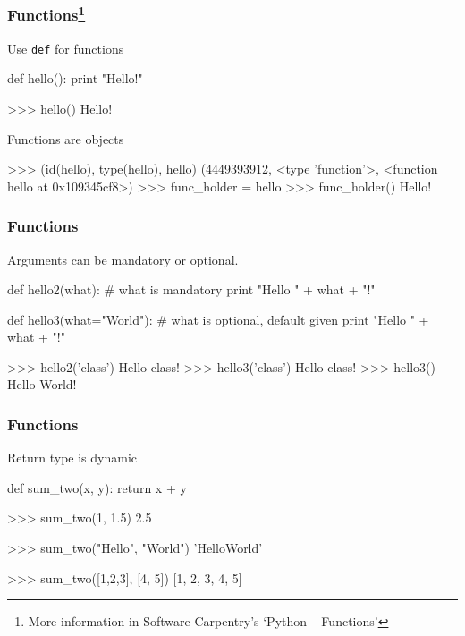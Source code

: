 \documentclass[xetex,10pt]{beamer}
\def\pythoni{\lstinline[language=pythontim]}
\def\spacer{\vspace*{1em}}
\begin{document}
\begin{frame}[fragile]
	\frametitle{Functions\footnote[frame]{More information in Software Carpentry's `Python -- Functions'}}

	Use \pythoni{def} for functions
\pause

\begin{python}
def hello():
    print "Hello!"
\end{python}
\begin{python}
>>> hello()
Hello!
\end{python}

	\spacer
\pause

Functions are objects
\begin{python}
>>> (id(hello), type(hello), hello)
(4449393912, <type 'function'>, <function hello at 0x109345cf8>)
>>> func_holder = hello
>>> func_holder()
Hello!
\end{python}
\end{frame}

\begin{frame}[fragile]
	\frametitle{Functions}

	Arguments can be mandatory or optional.
	
\begin{python}
def hello2(what):			# what is mandatory
    print "Hello " + what + "!"

def hello3(what="World"):	# what is optional, default given
    print "Hello " + what + "!"
\end{python}

	\spacer
	\pause

\begin{python}
>>> hello2('class')
Hello class!
>>> hello3('class')
Hello class!
>>> hello3()
Hello World!
\end{python}
\end{frame}

\begin{frame}[fragile]
	\frametitle{Functions}
	Return type is dynamic

\begin{python}
def sum_two(x, y):
    return x + y
\end{python}

	\spacer

\begin{python}
>>> sum_two(1, 1.5)
2.5
\end{python}
\pause
\begin{python}
>>> sum_two("Hello", "World")
'HelloWorld'
\end{python}
\pause
\begin{python}
>>> sum_two([1,2,3], [4, 5])
[1, 2, 3, 4, 5]
\end{python}

\end{frame}
\end{document}
